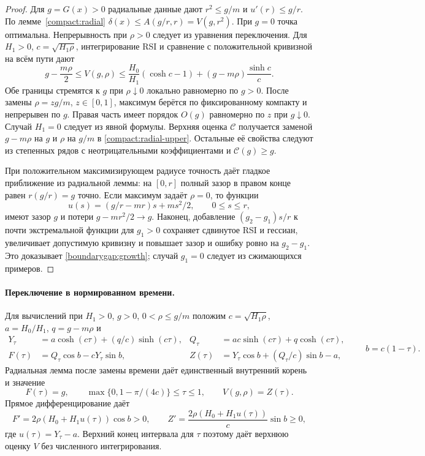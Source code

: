 \begin{proof}\label{boundarygap:proof}
Для $g=G(x)>0$ радиальные данные дают $r^2\le g/m$ и
$u'(r)\le g/r$. По лемме~\ref{compact:radial}
$\delta(x)\le A(g/r,r)=V(g,r^2)$.
При $g=0$ точка оптимальна.
Непрерывность при $\rho>0$ следует из уравнения переключения.
Для $H_1>0$, $c=\sqrt{H_1\rho}$, интегрирование RSI и
сравнение с положительной кривизной на всём пути дают
\begin{equation}\label{compact:radial-upper}
 g-\frac{m\rho}{2}\le V(g,\rho)
 \le\frac{H_0}{H_1}(\cosh c-1)
        +(g-m\rho)\frac{\sinh c}{c}.
\end{equation}
Обе границы стремятся к $g$ при $\rho\downarrow0$ локально
равномерно по $g>0$. После замены $\rho=zg/m$, $z\in[0,1]$,
максимум берётся по фиксированному компакту и непрерывен по $g$.
Правая часть имеет порядок $O(g)$ равномерно по $z$ при $g\downarrow0$.
Случай $H_1=0$ следует из явной формулы.
Верхняя оценка $\mathcal C$ получается заменой $g-m\rho$ на $g$
и $\rho$ на $g/m$ в \eqref{compact:radial-upper}.
Остальные её свойства следуют из степенных рядов с неотрицательными
коэффициентами и $\mathcal C(g)\ge g$.

При положительном максимизирующем радиусе точность даёт
гладкое приближение из радиальной леммы: на $[0,r]$ полный
зазор в правом конце равен $r(g/r)=g$ точно.
Если максимум задаёт $\rho=0$, то функции
\[
 u(s)=(g/r-mr)s+ms^2/2,\qquad 0\le s\le r,
\]
имеют зазор $g$ и потери $g-mr^2/2\to g$.
Наконец, добавление $(g_2-g_1)s/r$ к почти экстремальной
функции для $g_1>0$ сохраняет сдвинутое RSI и гессиан,
увеличивает допустимую кривизну и повышает зазор и ошибку
ровно на $g_2-g_1$. Это доказывает \eqref{boundarygap:growth};
случай $g_1=0$ следует из сжимающихся примеров.
\end{proof}

\paragraph{Переключение в нормированном времени.}
Для вычислений при $H_1>0$, $g>0$, $0<\rho\le g/m$ положим
$c=\sqrt{H_1\rho}$, $a=H_0/H_1$, $q=g-m\rho$ и
\[
 \begin{aligned}
 Y_\tau&=a\cosh(c\tau)+(q/c)\sinh(c\tau),&
 Q_\tau&=ac\sinh(c\tau)+q\cosh(c\tau),\\
 F(\tau)&=Q_\tau\cos b-cY_\tau\sin b,&
 Z(\tau)&=Y_\tau\cos b+(Q_\tau/c)\sin b-a,
 \end{aligned}
 \qquad b=c(1-\tau).
\]
Радиальная лемма после замены времени даёт единственный внутренний
корень и значение
\begin{equation}\label{boundarygap:switch}
 F(\tau)=g,\qquad
 \max\{0,1-\pi/(4c)\}\le\tau\le1,\qquad V(g,\rho)=Z(\tau).
\end{equation}
Прямое дифференцирование даёт
\begin{equation}\label{boundarygap:switch-derivatives}
 F'=2\rho(H_0+H_1u(\tau))\cos b>0,\qquad
 Z'=\frac{2\rho(H_0+H_1u(\tau))}{c}\sin b\ge0,
\end{equation}
где $u(\tau)=Y_\tau-a$. Верхний конец интервала для $\tau$
поэтому даёт верхнюю оценку $V$ без численного интегрирования.

